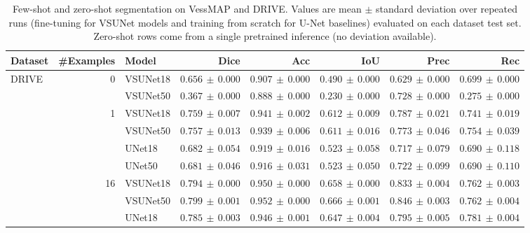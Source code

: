\documentclass[%
reprint,
nofootinbib,
 amsmath,amssymb,
aps,
superscriptaddress,
showkeys,
longbibliography
]{revtex4-1}
\begin{document}
\begin{table}[t]
    \caption{Few-shot and zero-shot segmentation on VessMAP and DRIVE. Values are mean $\pm$ standard deviation over repeated runs (fine-tuning for VSUNet models and training from scratch for U-Net baselines) evaluated on each dataset test set. Zero-shot rows come from a single pretrained inference (no deviation available).}
    \label{tab:combined_fewshot}
    \centering
    \begingroup
    \small
    \setlength{\tabcolsep}{4pt}
    \renewcommand{\arraystretch}{1.15}
    \begin{tabular}{l r l r r r r r}
        \hline
        \textbf{Dataset} & \textbf{\#Examples} & \textbf{Model} & \textbf{Dice} & \textbf{Acc} & \textbf{IoU} & \textbf{Prec} & \textbf{Rec} \\
        \hline
        \multirow{10}{*}{DRIVE} & \multirow{2}{*}{0} & VSUNet18 & $0.656 \,\pm\, 0.000$ & $0.907 \,\pm\, 0.000$ & $0.490 \,\pm\, 0.000$ & $0.629 \,\pm\, 0.000$ & $0.699 \,\pm\, 0.000$ \\
         &  & VSUNet50 & $0.367 \,\pm\, 0.000$ & $0.888 \,\pm\, 0.000$ & $0.230 \,\pm\, 0.000$ & $0.728 \,\pm\, 0.000$ & $0.275 \,\pm\, 0.000$ \\
         \cline{2-8}
         & \multirow{4}{*}{1} & VSUNet18 & $0.759 \,\pm\, 0.007$ & $0.941 \,\pm\, 0.002$ & $0.612 \,\pm\, 0.009$ & $0.787 \,\pm\, 0.021$ & $0.741 \,\pm\, 0.019$ \\
         &  & VSUNet50 & $0.757 \,\pm\, 0.013$ & $0.939 \,\pm\, 0.006$ & $0.611 \,\pm\, 0.016$ & $0.773 \,\pm\, 0.046$ & $0.754 \,\pm\, 0.039$ \\
         &  & UNet18 & $0.682 \,\pm\, 0.054$ & $0.919 \,\pm\, 0.016$ & $0.523 \,\pm\, 0.058$ & $0.717 \,\pm\, 0.079$ & $0.690 \,\pm\, 0.118$ \\
         &  & UNet50 & $0.681 \,\pm\, 0.046$ & $0.916 \,\pm\, 0.031$ & $0.523 \,\pm\, 0.050$ & $0.722 \,\pm\, 0.099$ & $0.690 \,\pm\, 0.110$ \\
         \cline{2-8}
         & \multirow{4}{*}{16} & VSUNet18 & $0.794 \,\pm\, 0.000$ & $0.950 \,\pm\, 0.000$ & $0.658 \,\pm\, 0.000$ & $0.833 \,\pm\, 0.004$ & $0.762 \,\pm\, 0.003$ \\
         &  & VSUNet50 & $0.799 \,\pm\, 0.001$ & $0.952 \,\pm\, 0.000$ & $0.666 \,\pm\, 0.001$ & $0.846 \,\pm\, 0.003$ & $0.762 \,\pm\, 0.004$ \\
         &  & UNet18 & $0.785 \,\pm\, 0.003$ & $0.946 \,\pm\, 0.001$ & $0.647 \,\pm\, 0.004$ & $0.795 \,\pm\, 0.005$ & $0.781 \,\pm\, 0.004$ \\

\end{tabular}
\end{table}
\end{document}
